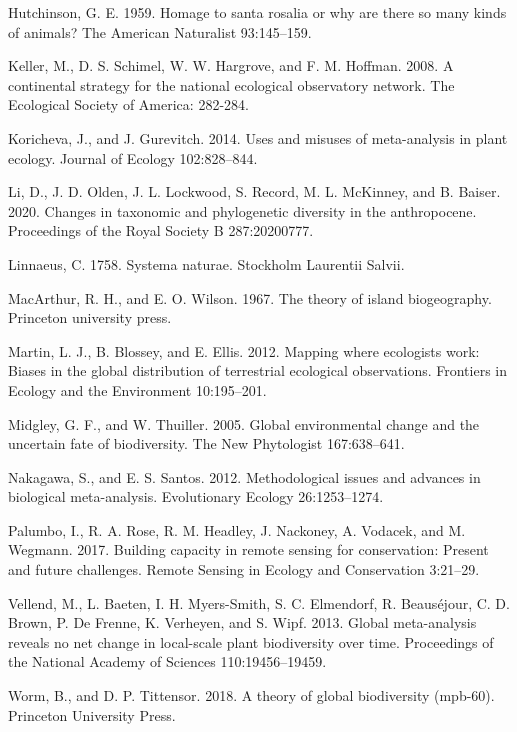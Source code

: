 \documentclass[
  12pt,
]{article}
\newlength{\cslhangindent}
\newenvironment{cslreferences}%
  {\setlength{\parindent}{0pt}%
  \everypar{\setlength{\hangindent}{\cslhangindent}}\ignorespaces}%
  {\par}
\begin{document}
\begin{cslreferences}
\leavevmode\hypertarget{ref-hutchinson1959homage}{}%
Hutchinson, G. E. 1959. Homage to santa rosalia or why are there so many kinds of animals? The American Naturalist 93:145--159.

\leavevmode\hypertarget{ref-keller2008continental}{}%
Keller, M., D. S. Schimel, W. W. Hargrove, and F. M. Hoffman. 2008. A continental strategy for the national ecological observatory network. The Ecological Society of America: 282-284.

\leavevmode\hypertarget{ref-koricheva2014uses}{}%
Koricheva, J., and J. Gurevitch. 2014. Uses and misuses of meta-analysis in plant ecology. Journal of Ecology 102:828--844.

\leavevmode\hypertarget{ref-li2020changes}{}%
Li, D., J. D. Olden, J. L. Lockwood, S. Record, M. L. McKinney, and B. Baiser. 2020. Changes in taxonomic and phylogenetic diversity in the anthropocene. Proceedings of the Royal Society B 287:20200777.

\leavevmode\hypertarget{ref-linnaeus1758systema}{}%
Linnaeus, C. 1758. Systema naturae. Stockholm Laurentii Salvii.

\leavevmode\hypertarget{ref-macarthur1967theory}{}%
MacArthur, R. H., and E. O. Wilson. 1967. The theory of island biogeography. Princeton university press.

\leavevmode\hypertarget{ref-martin2012mapping}{}%
Martin, L. J., B. Blossey, and E. Ellis. 2012. Mapping where ecologists work: Biases in the global distribution of terrestrial ecological observations. Frontiers in Ecology and the Environment 10:195--201.

\leavevmode\hypertarget{ref-midgley2005global}{}%
Midgley, G. F., and W. Thuiller. 2005. Global environmental change and the uncertain fate of biodiversity. The New Phytologist 167:638--641.

\leavevmode\hypertarget{ref-nakagawa2012methodological}{}%
Nakagawa, S., and E. S. Santos. 2012. Methodological issues and advances in biological meta-analysis. Evolutionary Ecology 26:1253--1274.

\leavevmode\hypertarget{ref-palumbo2017building}{}%
Palumbo, I., R. A. Rose, R. M. Headley, J. Nackoney, A. Vodacek, and M. Wegmann. 2017. Building capacity in remote sensing for conservation: Present and future challenges. Remote Sensing in Ecology and Conservation 3:21--29.

\leavevmode\hypertarget{ref-vellend2013global}{}%
Vellend, M., L. Baeten, I. H. Myers-Smith, S. C. Elmendorf, R. Beauséjour, C. D. Brown, P. De Frenne, K. Verheyen, and S. Wipf. 2013. Global meta-analysis reveals no net change in local-scale plant biodiversity over time. Proceedings of the National Academy of Sciences 110:19456--19459.

\leavevmode\hypertarget{ref-worm2018theory}{}%
Worm, B., and D. P. Tittensor. 2018. A theory of global biodiversity (mpb-60). Princeton University Press.
\end{cslreferences}
\end{document}
